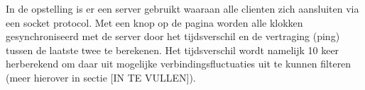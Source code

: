 In de opstelling is er een server gebruikt waaraan alle clienten zich aansluiten via een socket protocol. Met een knop op de pagina worden alle klokken gesynchroniseerd met de server door het tijdsverschil en de vertraging (ping) tussen de laatste twee te berekenen.
Het tijdsverschil wordt namelijk 10 keer herberekend om daar uit mogelijke verbindingsfluctuaties uit te kunnen filteren (meer hierover in sectie [IN TE VULLEN]).
